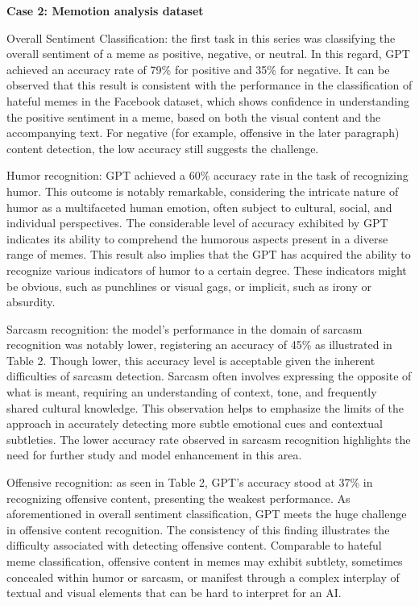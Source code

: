 \documentclass[conference]{IEEEtran}
\begin{document}
{\bfseries Case 2: Memotion analysis dataset}

Overall Sentiment Classification: the first task in this series was classifying the overall sentiment of a meme as positive, negative, or neutral. In this regard, GPT achieved an accuracy rate of 79\% for positive and 35\% for negative. It can be observed that this result is consistent with the performance in the classification of hateful memes in the Facebook dataset, which shows confidence in understanding the positive sentiment in a meme, based on both the visual content and the accompanying text. For negative (for example, offensive in the later paragraph) content detection, the low accuracy still suggests the challenge.

Humor recognition: GPT achieved a 60\% accuracy rate in the task of recognizing humor. This outcome is notably remarkable, considering the intricate nature of humor as a multifaceted human emotion, often subject to cultural, social, and individual perspectives. The considerable level of accuracy exhibited by GPT indicates its ability to comprehend the humorous  aspects present in a diverse range of memes. This result also implies that the GPT has acquired the ability to recognize various indicators of humor to a certain degree. These indicators might be obvious, such as punchlines or visual gags, or implicit, such as irony or absurdity.

Sarcasm recognition: the model's performance in the domain of sarcasm recognition was notably lower, registering an accuracy of 45\% as illustrated in Table 2. Though lower, this accuracy level is acceptable given the inherent difficulties of sarcasm detection. Sarcasm often involves expressing the opposite of what is meant, requiring an understanding of context, tone, and frequently shared cultural knowledge. 
This observation helps to emphasize the limits of the approach in accurately detecting more subtle emotional cues and contextual subtleties. The lower accuracy rate observed in sarcasm recognition highlights the need for further study and model enhancement in this area.

Offensive recognition: as seen in Table 2, GPT's accuracy stood at 37\% in recognizing offensive content, presenting the weakest performance. As aforementioned in overall sentiment classification, GPT meets the huge challenge in offensive content recognition. The consistency of this finding illustrates the difficulty associated with detecting offensive content.  
Comparable to hateful meme classification, offensive content in memes may exhibit subtlety, sometimes concealed within humor or sarcasm, or manifest through a complex interplay of textual and visual elements that can be hard to interpret for an AI.
\end{document}
